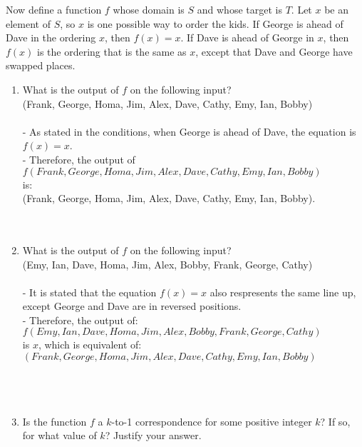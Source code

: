 \documentclass{amsart}
\theoremstyle{definition}
\theoremstyle{Exercise}
\theoremstyle{remark}
\theoremstyle{rule}
\numberwithin{equation}{section}
\begin{document}
Now define a function $f$ whose domain is $S$ and whose target is $T$. Let $x$ be an element of $S$, so $x$ is one possible way to order the kids. If George 
is ahead of Dave in the ordering $x$, then $f(x) = x$. If Dave is ahead of George in $x$, then $f(x)$ is the ordering that is the same as $x$, except that 
Dave and George have swapped places.\\
\begin{enumerate}[label=(\alph*)]
  \item What is the output of $f$ on the following input?\\
  (Frank, George, Homa, Jim, Alex, Dave, Cathy, Emy, Ian, Bobby)\\\\
  - As stated in the conditions, when George is ahead of Dave, the equation is $f(x)=x$.\\ 
  - Therefore, the output of\\ $f(Frank, George, Homa, Jim, Alex, Dave, Cathy, Emy, Ian, Bobby)$\\ is:\\ (Frank, George, Homa, Jim, Alex, Dave, Cathy, Emy, Ian, Bobby).\\
\\\\
  \item What is the output of $f$ on the following input?\\
(Emy, Ian, Dave, Homa, Jim, Alex, Bobby, Frank, George, Cathy)\\\\
  - It is stated that the equation $f(x)=x$ also respresents the same line up, except George and Dave are in reversed positions.\\
  - Therefore, the output of:\\ $f(Emy, Ian, Dave, Homa, Jim, Alex, Bobby, Frank, George, Cathy)$\\ is $x$, which is equivalent of:\\ $(Frank, George, Homa, Jim, Alex, Dave, Cathy, Emy, Ian, Bobby)$\\
\\\\\
\vspace*{0.3in}
  \item Is the function $f$ a $k$-to-1 correspondence for some positive integer $k$? If so, for what value of $k$? Justify your answer.\\\\

\end{enumerate}
\end{document}

